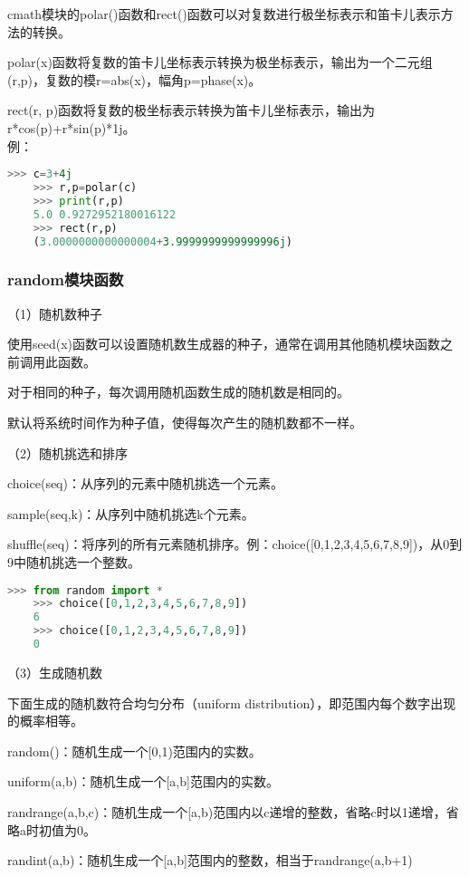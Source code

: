 \documentclass[11pt,a4paper]{article}
\begin{document}
cmath模块的polar()函数和rect()函数可以对复数进行极坐标表示和笛卡儿表示方法的转换。

polar(x)函数将复数的笛卡儿坐标表示转换为极坐标表示，输出为一个二元组(r,p)，复数的模r=abs(x)，幅角p=phase(x)。

rect(r, p)函数将复数的极坐标表示转换为笛卡儿坐标表示，输出为\\
r*cos(p)+r*sin(p)*1j。\\
例：
\begin{lstlisting}[language={Python}]
    >>> c=3+4j
    >>> r,p=polar(c)
    >>> print(r,p)
    5.0 0.9272952180016122
    >>> rect(r,p)
    (3.0000000000000004+3.9999999999999996j)
\end{lstlisting}

\subsubsection{random模块函数}

（1）随机数种子

使用seed(x)函数可以设置随机数生成器的种子，通常在调用其他随机模块函数之前调用此函数。

对于相同的种子，每次调用随机函数生成的随机数是相同的。

默认将系统时间作为种子值，使得每次产生的随机数都不一样。

（2）随机挑选和排序

choice(seq)：从序列的元素中随机挑选一个元素。

sample(seq,k)：从序列中随机挑选k个元素。

shuffle(seq)：将序列的所有元素随机排序。例：choice([0,1,2,3,4,5,6,7,8,9])，从0到9中随机挑选一个整数。

\begin{lstlisting}[language={Python}]
    >>> from random import *
    >>> choice([0,1,2,3,4,5,6,7,8,9])
    6
    >>> choice([0,1,2,3,4,5,6,7,8,9])
    0
\end{lstlisting}

（3）生成随机数

下面生成的随机数符合均匀分布（uniform distribution），即范围内每个数字出现的概率相等。

random()：随机生成一个[0,1)范围内的实数。

uniform(a,b)：随机生成一个[a,b]范围内的实数。

randrange(a,b,c)：随机生成一个[a,b)范围内以c递增的整数，省略c时以1递增，省略a时初值为0。

randint(a,b)：随机生成一个[a,b]范围内的整数，相当于randrange(a,b+1)
\end{document}
